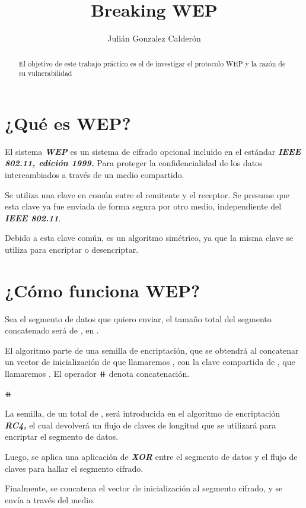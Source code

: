 \documentclass[
]{article}
\title{Breaking WEP}
\author{Julián Gonzalez Calderón}
\date{}
\begin{document}
\maketitle
\begin{abstract}
El objetivo de este trabajo práctico es el de investigar el protocolo
WEP y la razón de su vulnerabilidad
\end{abstract}

\hypertarget{quuxe9-es-wep}{%
\section{¿Qué es WEP?}\label{quuxe9-es-wep}}

El sistema \textbf{\emph{WEP}} es un sistema de cifrado opcional
incluido en el estándar \textbf{\emph{IEEE 802.11, edición 1999.}} Para
proteger la confidencialidad de los datos intercambiados a través de un
medio compartido.

Se utiliza una clave en común entre el remitente y el receptor. Se
presume que esta clave ya fue enviada de forma segura por otro medio,
independiente del \textbf{\emph{IEEE 802.11}}.

Debido a esta clave común, es un algoritmo simétrico, ya que la misma
clave se utiliza para encriptar o desencriptar.

\hypertarget{cuxf3mo-funciona-wep}{%
\section{¿Cómo funciona WEP?}\label{cuxf3mo-funciona-wep}}

Sea {} el segmento de datos que quiero enviar, el tamaño total del
segmento concatenado será de {}, en {}.

El algoritmo parte de una semilla de encriptación, que se obtendrá al
concatenar un vector de inicialización de {} que llamaremos {}, con la
clave compartida de {}, que llamaremos {}. El operador {⧺} denota
concatenación.

⧺

La semilla, de un total de {}, será introducida en el algoritmo de
encriptación \textbf{\emph{RC4,}} el cual devolverá un flujo de claves
de longitud {} que se utilizará para encriptar el segmento de datos.

Luego, se aplica una aplicación de \textbf{\emph{XOR}} entre el segmento
de datos y el flujo de claves para hallar el segmento cifrado.

Finalmente, se concatena el vector de inicialización {} al segmento
cifrado, y se envía a través del medio.
\end{document}
